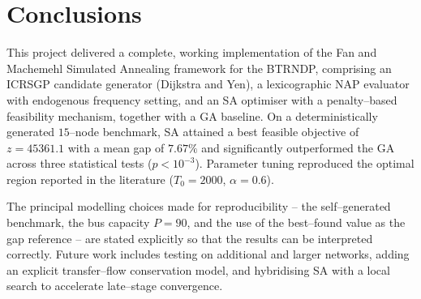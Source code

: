 \documentclass [a4paper, 11pt, titlepage] {article}
\begin{document}
\clearpage
\section{Conclusions}
\label{sec:conclusion}

This project delivered a complete, working implementation of the Fan and
Machemehl \cite{fan2006} Simulated Annealing framework for the BTRNDP,
comprising an ICRSGP candidate generator (Dijkstra and Yen), a lexicographic NAP
evaluator with endogenous frequency setting, and an SA optimiser with a
penalty--based feasibility mechanism, together with a GA baseline. On a
deterministically generated $15$--node benchmark, SA attained a best feasible
objective of $z=45361.1$ with a mean gap of $7.67\%$ and significantly
outperformed the GA across three statistical tests ($p<10^{-3}$). Parameter
tuning reproduced the optimal region reported in the literature
($T_0=2000$, $\alpha=0.6$).

The principal modelling choices made for reproducibility -- the self--generated
benchmark, the bus capacity $P=90$, and the use of the best--found value as the
gap reference -- are stated explicitly so that the results can be interpreted
correctly. Future work includes testing on additional and larger networks,
adding an explicit transfer--flow conservation model, and hybridising SA with a
local search to accelerate late--stage convergence.
\end{document}
